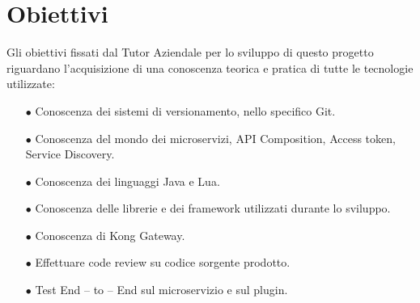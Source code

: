 \section{Obiettivi}\label{sec:obiettivi}
Gli obiettivi fissati dal Tutor Aziendale per lo sviluppo di questo progetto riguardano l’acquisizione di una conoscenza teorica e pratica di tutte le tecnologie utilizzate:
\begin{itemize}
	\item[$\bullet$]Conoscenza dei sistemi di versionamento, nello specifico Git.
	\item[$\bullet$]Conoscenza del mondo dei microservizi, API Composition, Access token, Service Discovery.
	\item[$\bullet$]Conoscenza dei linguaggi Java e Lua.
	\item[$\bullet$]Conoscenza delle librerie e dei framework utilizzati durante lo sviluppo.
	\item[$\bullet$]Conoscenza di Kong Gateway.
	\item[$\bullet$]Effettuare code review su codice sorgente prodotto.
	\item[$\bullet$]Test End – to – End sul microservizio e sul plugin.
\end{itemize}